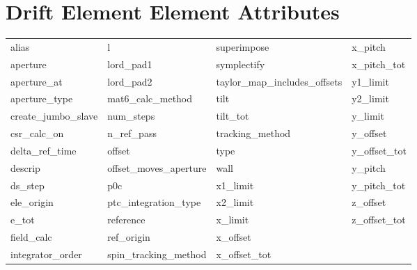  \section{Drift Element Element Attributes}
 \label{s:list.drift}
 
 \begin{tabular}{llll} \toprule
alias                       & l                           & superimpose                 & x_pitch                     \\
aperture                    & lord_pad1                   & symplectify                 & x_pitch_tot                 \\
aperture_at                 & lord_pad2                   & taylor_map_includes_offsets & y1_limit                    \\
aperture_type               & mat6_calc_method            & tilt                        & y2_limit                    \\
create_jumbo_slave          & num_steps                   & tilt_tot                    & y_limit                     \\
csr_calc_on                 & n_ref_pass                  & tracking_method             & y_offset                    \\
delta_ref_time              & offset                      & type                        & y_offset_tot                \\
descrip                     & offset_moves_aperture       & wall                        & y_pitch                     \\
ds_step                     & p0c                         & x1_limit                    & y_pitch_tot                 \\
ele_origin                  & ptc_integration_type        & x2_limit                    & z_offset                    \\
e_tot                       & reference                   & x_limit                     & z_offset_tot                \\
field_calc                  & ref_origin                  & x_offset                    &                             \\
integrator_order            & spin_tracking_method        & x_offset_tot                &                             \\
 \bottomrule
 \end{tabular}
 \vfill
 

